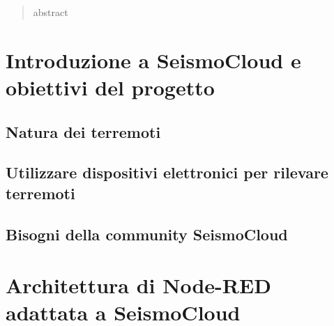 \documentclass[a4paper,10pt]{memoir}
\begin{document}
\frontmatter


\maketitle
\cleardoublepage


\begin{abstract}
	abstract
\end{abstract}
\cleardoublepage

\tableofcontents
\cleardoublepage

\mainmatter

\renewcommand\chapterheadstart{}
\renewcommand\printchaptername{}
\renewcommand\chapternamenum{}
\renewcommand\printchapternum{}
\renewcommand\afterchapternum{}
\renewcommand\printchaptertitle[1]{\chaptitlefont \thechapter. \space #1}


\chapter{Introduzione a SeismoCloud e obiettivi del progetto}

\section{Natura dei terremoti}

\section{Utilizzare dispositivi elettronici per rilevare terremoti}

\section{Bisogni della community SeismoCloud}


\chapter{Architettura di Node-RED adattata a SeismoCloud}
\end{document}
